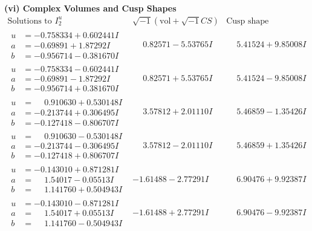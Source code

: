 \documentclass[1p]{elsarticle_modified}
\theoremstyle{definition}
\newcommand{\I}{\sqrt{-1}}
\begin{document}
\newpage\flushleft \textbf{(vi) Complex Volumes and Cusp Shapes}
$$\begin{array}{c|c|c}  
\text{Solutions to }I^u_{2}& \I (\text{vol} + \sqrt{-1}CS) & \text{Cusp shape}\\
 \hline 
\begin{aligned}
u &= -0.758334 + 0.602441 I \\
a &= -0.69891 + 1.87292 I \\
b &= -0.956714 - 0.381670 I\end{aligned}
 & \phantom{-}0.82571 - 5.53765 I & \phantom{-}5.41524 + 9.85008 I \\ \hline\begin{aligned}
u &= -0.758334 - 0.602441 I \\
a &= -0.69891 - 1.87292 I \\
b &= -0.956714 + 0.381670 I\end{aligned}
 & \phantom{-}0.82571 + 5.53765 I & \phantom{-}5.41524 - 9.85008 I \\ \hline\begin{aligned}
u &= \phantom{-}0.910630 + 0.530148 I \\
a &= -0.213744 + 0.306495 I \\
b &= -0.127418 - 0.806707 I\end{aligned}
 & \phantom{-}3.57812 + 2.01110 I & \phantom{-}5.46859 - 1.35426 I \\ \hline\begin{aligned}
u &= \phantom{-}0.910630 - 0.530148 I \\
a &= -0.213744 - 0.306495 I \\
b &= -0.127418 + 0.806707 I\end{aligned}
 & \phantom{-}3.57812 - 2.01110 I & \phantom{-}5.46859 + 1.35426 I \\ \hline\begin{aligned}
u &= -0.143010 + 0.871281 I \\
a &= \phantom{-}1.54017 - 0.05513 I \\
b &= \phantom{-}1.141760 + 0.504943 I\end{aligned}
 & -1.61488 - 2.77291 I & \phantom{-}6.90476 + 9.92387 I \\ \hline\begin{aligned}
u &= -0.143010 - 0.871281 I \\
a &= \phantom{-}1.54017 + 0.05513 I \\
b &= \phantom{-}1.141760 - 0.504943 I\end{aligned}
 & -1.61488 + 2.77291 I & \phantom{-}6.90476 - 9.92387 I \\ \hline\begin{aligned}

\end{aligned}
\end{array}$$
\end{document}
